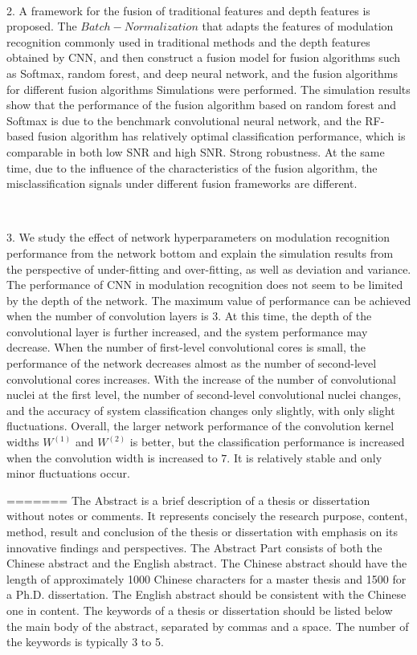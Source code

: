 \begin{englishabstract}
\par~\par
2. A framework for the fusion of traditional features and depth features is proposed. The $Batch-Normalization$ that adapts the features of modulation recognition commonly used in traditional methods and the depth features obtained by CNN, and then construct a fusion model for fusion algorithms such as Softmax, random forest, and deep neural network, and the fusion algorithms for different fusion algorithms Simulations were performed. The simulation results show that the performance of the fusion algorithm based on random forest and Softmax is due to the benchmark convolutional neural network, and the RF-based fusion algorithm has relatively optimal classification performance, which is comparable in both low SNR and high SNR. Strong robustness. At the same time, due to the influence of the characteristics of the fusion algorithm, the misclassification signals under different fusion frameworks are different.
\par~\par
3. We study the effect of network hyperparameters on modulation recognition performance from the network bottom and explain the simulation results from the perspective of under-fitting and over-fitting, as well as deviation and variance. The performance of CNN in modulation recognition does not seem to be limited by the depth of the network. The maximum value of performance can be achieved when the number of convolution layers is $3$. At this time, the depth of the convolutional layer is further increased, and the system performance may decrease. When the number of first-level convolutional cores is small, the performance of the network decreases almost as the number of second-level convolutional cores increases. With the increase of the number of convolutional nuclei at the first level, the number of second-level convolutional nuclei changes, and the accuracy of system classification changes only slightly, with only slight fluctuations. Overall, the larger network performance of the convolution kernel widths $W^{(1)}$ and $W^{(2)}$ is better, but the classification performance is increased when the convolution width is increased to $7$. It is relatively stable and only minor fluctuations occur.
~\par
{}
=======
The Abstract is a brief description of a thesis or dissertation without notes or comments. It represents concisely the research purpose, content, method, result and conclusion of the thesis or dissertation with emphasis on its innovative findings and perspectives. The Abstract Part consists of both the Chinese abstract and the English abstract. The Chinese abstract should have the length of approximately 1000 Chinese characters for a master thesis and 1500 for a Ph.D. dissertation. The English abstract should be consistent with the Chinese one in content. The keywords of a thesis or dissertation should be listed below the main body of the abstract, separated by commas and a space. The number of the keywords is typically 3 to 5.

\end{englishabstract}
